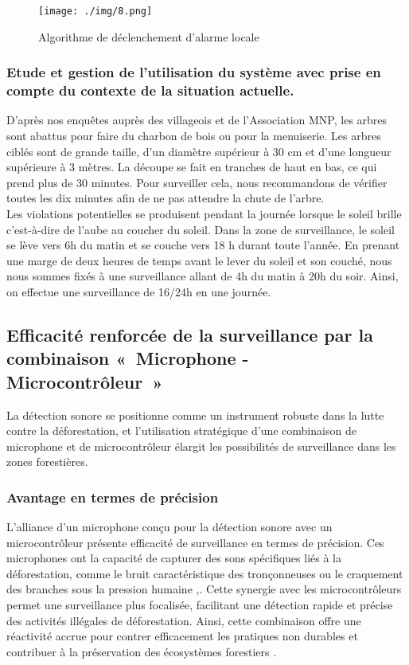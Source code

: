 \begin{figure}[H]
	\centering
	\texttt{[image: ./img/8.png]}
	\caption{Algorithme de déclenchement d'alarme locale}
\end{figure}

\subsubsection{Etude et gestion de l'utilisation du système avec prise en compte du contexte de la situation actuelle.}
D'après nos enquêtes auprès des villageois et de l'Association MNP, les arbres sont abattus pour faire du charbon de bois ou pour la menuiserie. Les arbres ciblés sont de grande taille, d'un diamètre supérieur à 30 cm et d'une longueur supérieure à 3 mètres. La découpe se fait en tranches de haut en bas, ce qui prend plus de 30 minutes. Pour surveiller cela, nous recommandons de vérifier toutes les dix minutes afin de ne pas attendre la chute de l'arbre.
\\

Les violations potentielles se produisent pendant la journée lorsque le soleil brille c’est-à-dire de l'aube au coucher du soleil. Dans la zone de surveillance, le soleil se lève vers 6h du matin et se couche vers 18 h durant toute l'année. En prenant une marge de deux heures de temps avant le lever du soleil et son couché, nous nous sommes fixés à une surveillance allant de 4h du matin à 20h du soir. Ainsi, on effectue une surveillance de 16/24h en une journée.

\subsection{Efficacité renforcée de la surveillance par la combinaison « Microphone - Microcontrôleur »}
La détection sonore se positionne comme un instrument robuste dans la lutte contre la déforestation, et l'utilisation stratégique d'une combinaison de microphone et de microcontrôleur élargit les possibilités de surveillance dans les zones forestières.

\subsubsection{Avantage en termes de précision}
L'alliance d'un microphone conçu pour la détection sonore avec un microcontrôleur présente efficacité de surveillance en termes de précision. Ces microphones ont la capacité de capturer des sons spécifiques liés à la déforestation, comme le bruit caractéristique des tronçonneuses ou le craquement des branches sous la pression humaine \cite{59},\cite{60}. Cette synergie avec les microcontrôleurs permet une surveillance plus focalisée, facilitant une détection rapide et précise des activités illégales de déforestation. Ainsi, cette combinaison offre une réactivité accrue pour contrer efficacement les pratiques non durables et contribuer à la préservation des écosystèmes forestiers \cite{61}.

